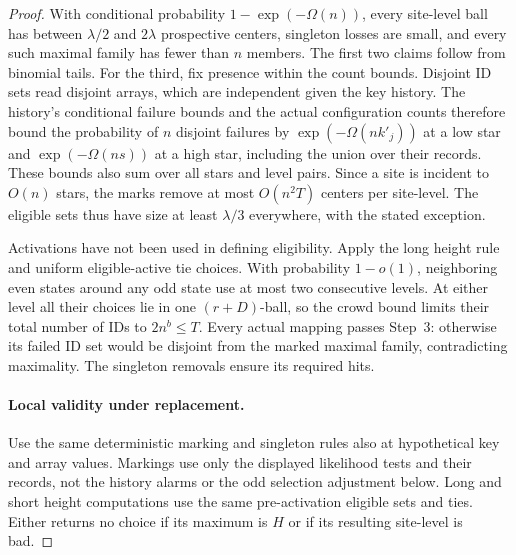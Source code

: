 \begin{proof}
With conditional probability \(1-\exp(-\Omega(n))\), every site-level
ball has between \(\lambda/2\) and \(2\lambda\) prospective centers,
singleton losses are small, and every such maximal family has fewer than
\(n\) members. The first two claims follow from binomial tails.
For the third, fix presence within the count bounds. Disjoint ID sets
read disjoint arrays, which are independent given the key history.
The history's conditional failure bounds and the actual configuration
counts therefore bound the probability of \(n\) disjoint failures by
\(\exp(-\Omega(nk'_j))\) at a low star and
\(\exp(-\Omega(ns))\) at a high star, including the union over their
records. These bounds also sum over all stars and level pairs.
Since a site is incident to \(O(n)\) stars, the marks remove at most
\(O(n^2T)\) centers per site-level. The eligible sets thus have size
at least \(\lambda/3\) everywhere, with the stated exception.

Activations have not been used in defining eligibility. Apply the long
height rule and uniform eligible-active tie choices. With probability
\(1-o(1)\), neighboring even states around any odd state use at most
two consecutive levels. At either level all their choices lie in one
\((r+D)\)-ball, so the crowd bound limits their total number of IDs to
\(2n^b\le T\). Every actual mapping passes Step~3: otherwise its failed
ID set would be disjoint from the marked maximal family, contradicting
maximality. The singleton removals ensure its required hits.

\paragraph{Local validity under replacement.}
Use the same deterministic marking and singleton rules also at
hypothetical key and array values. Markings use only the displayed
likelihood tests and their records, not the history alarms or the odd
selection adjustment below. Long and short height computations use the
same pre-activation eligible sets and ties. Either returns no choice if
its maximum is \(H\) or if its resulting site-level is bad.


\end{proof}
